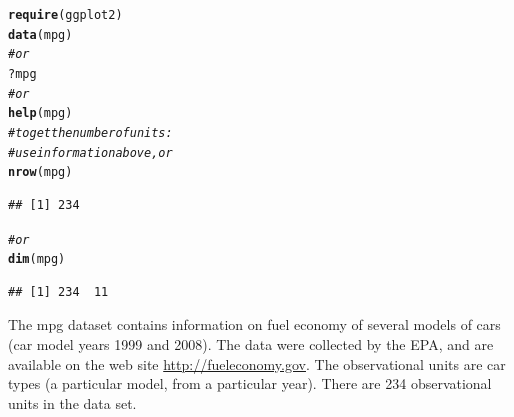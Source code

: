 \documentclass[twoside]{book}\usepackage[]{graphicx}\usepackage[]{xcolor}
\makeatletter
\newcommand{\hlcom}[1]{\textcolor[rgb]{0.678,0.584,0.686}{\textit{#1}}}%
\newcommand{\hlopt}[1]{\textcolor[rgb]{0,0,0}{#1}}%
\newcommand{\hlstd}[1]{\textcolor[rgb]{0.345,0.345,0.345}{#1}}%
\newcommand{\hlkwd}[1]{\textcolor[rgb]{0.737,0.353,0.396}{\textbf{#1}}}%
\newenvironment{kframe}{%
 \def\at@end@of@kframe{}%
 \ifinner\ifhmode%
  \def\at@end@of@kframe{\end{minipage}}%
  \begin{minipage}{\columnwidth}%
 \fi\fi%
 \def\FrameCommand##1{\hskip\@totalleftmargin \hskip-\fboxsep
 \colorbox{shadecolor}{##1}\hskip-\fboxsep
     \hskip-\linewidth \hskip-\@totalleftmargin \hskip\columnwidth}%
 \MakeFramed {\advance\hsize-\width
   \@totalleftmargin\z@ \linewidth\hsize
   \@setminipage}}%
 {\par\unskip\endMakeFramed%
 \at@end@of@kframe}
\newenvironment{knitrout}{}{} %
\makeatother
\begin{document}
\begin{solution}
\begin{knitrout}
\color{fgcolor}\begin{kframe}
\begin{alltt}
\hlkwd{require}\hlstd{(ggplot2)}
\hlkwd{data}\hlstd{(mpg)}
\hlcom{#or}
\hlopt{?}\hlstd{mpg}
\hlcom{#or}
\hlkwd{help}\hlstd{(mpg)}
\hlcom{#to get the number of units:}
\hlcom{#use information above, or}
\hlkwd{nrow}\hlstd{(mpg)}
\end{alltt}
\begin{verbatim}
## [1] 234
\end{verbatim}
\begin{alltt}
\hlcom{#or}
\hlkwd{dim}\hlstd{(mpg)}
\end{alltt}
\begin{verbatim}
## [1] 234  11
\end{verbatim}
\end{kframe}
\end{knitrout}
The mpg dataset contains information on fuel economy of several models of cars (car model years 1999 and 2008). The data were collected by the EPA, and are available on the web site \url{http://fueleconomy.gov}.  The observational units are car types (a particular model, from a particular year).  There are 234 observational units in the data set.
\end{solution}
\end{document}
